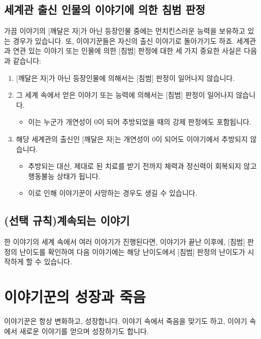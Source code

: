 \documentclass[12pt]{report}
\begin{document}
	\section*{세계관 출신 인물의 이야기에 의한 침범 판정}
	가끔 이야기의 [깨달은 자]가 아닌 등장인물 중에는 먼치킨스러운 능력을 보유하고 있는 경우가 있습니다. 또, 이야기꾼들은 자신의 출신 이야기로 돌아가기도 하죠. 세계관과 연관 있는 이야기 또는 인물에 의한 [침범] 판정에 대한 세 가지 중요한 사실은 다음과 같습니다:
	\begin{enumerate}
		\item {}[깨달은 자]가 아닌 등장인물에 의해서는 [침범] 판정이 일어나지 않습니다.
		\item 그 세계 속에서 얻은 이야기 또는 능력에 의해서는 [침범] 판정이 일어나지 않습니다.
		\begin{itemize}
			\item 이는 누군가 개연성이 0이 되어 추방되었을 때의 강제 판정에도 포함됩니다.
		\end{itemize}
		\item 해당 세계관의 출신인 [깨달은 자]는 개연성이 0이 되어도 이야기에서 추방되지 않습니다.
		\begin{itemize}
			\item 추방되는 대신, 제대로 된 치료를 받기 전까지 체력과 정신력이 회복되지 않고 행동불능 상태가 됩니다.
			\item 이로 인해 이야기꾼이 사망하는 경우도 생길 수 있습니다.
		\end{itemize}
	\end{enumerate}
	
	\section*{(선택 규칙)계속되는 이야기}
	한 이야기의 세계 속에서 여러 이야기가 진행된다면, 이야기가 끝난 이후에, [침범] 판정의 난이도를 확인하여 다음 이야기에는 해당 난이도에서 [침범] 판정의 난이도가 시작하게 할 수 있습니다.
	
	\chapter{이야기꾼의 성장과 죽음}\label{성장}
	이야기꾼은 항상 변화하고, 성장합니다. 이야기 속에서 죽음을 맞기도 하고, 이야기 속에서 새로운 이야기를 얻으며 성장하기도 합니다.
	
\end{document}

